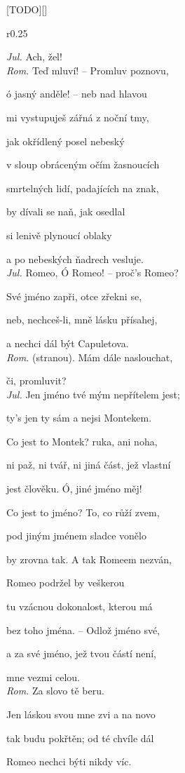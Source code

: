 \documentclass{extarticle} %
\begin{document}
\newpage


\changefontsize{8pt}

[TODO][\killpage]

\noindent\begin{wrapfigure}{r}{0.25\textwidth}
\tiny

\setlength{\parindent}{3pt}
\noindent \textit{Jul.} Ach, žel! \\
\textit{Rom.} Teď mluví! -- Promluv poznovu, \par
ó jasný anděle! -- neb nad hlavou \par
mi vystupuješ zářná z noční tmy, \par
jak okřídlený posel nebeský \par
v sloup obráceným očím žasnoucích \par
smrtelných lidí, padajících na znak, \par
by dívali se naň, jak osedlal \par
si lenivě plynoucí oblaky \par
a po nebeských ňadrech vesluje. \\
\textit{Jul.} Romeo, Ó Romeo! -- proč's Romeo? \par
Své jméno zapři, otce zřekni se, \par
neb, nechceš-li, mně lásku přísahej, \par
a nechci dál být Capuletova. \\
\textit{Rom.} (stranou). Mám dále naslouchat, \par 
či, promluvit? \\
\textit{Jul.} Jen jméno tvé mým nepřítelem jest; \par
ty's jen ty sám a nejsi Montekem. \par
Co jest to Montek? ruka, ani noha, \par
ni paž, ni tvář, ni jiná část, jež vlastní \par
jest člověku. Ó, jiné jméno měj! \par
Co jest to jméno? To, co růží zvem, \par
pod jiným jménem sladce vonělo \par
by zrovna tak. A tak Romeem nezván, \par
Romeo podržel by veškerou \par
tu vzácnou dokonalost, kterou má \par
bez toho jména. -- Odlož jméno své, \par
a za své jméno, jež tvou částí není, \par
mne vezmi celou. \\
\textit{Rom.} Za slovo tě beru. \par
Jen láskou svou mne zvi a na novo \par
tak budu pokřtěn; od té chvíle dál \par
Romeo nechci býti nikdy víc. 
\end{wrapfigure}
\end{document}
